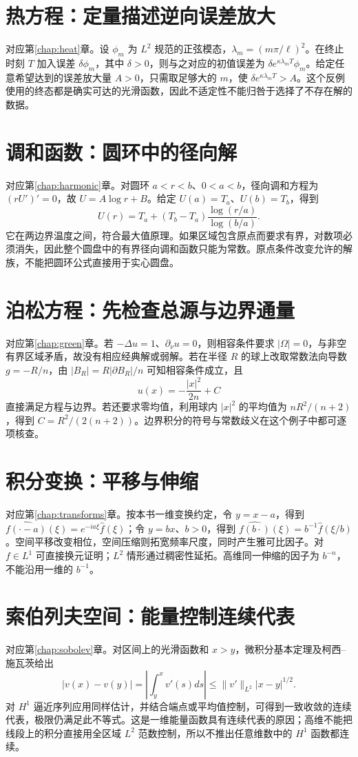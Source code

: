 \section{热方程：定量描述逆向误差放大}
对应第\ref{chap:heat}章。设 $\phi_m$ 为 $L^2$ 规范的正弦模态，$\lambda_m=(m\pi/\ell)^2$。在终止时刻 $T$ 加入误差 $\delta\phi_m$，其中 $\delta>0$，则与之对应的初值误差为 $\delta e^{\kappa\lambda_mT}\phi_m$。给定任意希望达到的误差放大量 $A>0$，只需取足够大的 $m$，使 $\delta e^{\kappa\lambda_mT}>A$。这个反例使用的终态都是确实可达的光滑函数，因此不适定性不能归咎于选择了不存在解的数据。

\section{调和函数：圆环中的径向解}
对应第\ref{chap:harmonic}章。对圆环 $a<r<b$、$0<a<b$，径向调和方程为 $(rU')'=0$，故 $U=A\log r+B$。给定 $U(a)=T_a$、$U(b)=T_b$，得到
\[
 U(r)=T_a+(T_b-T_a)\frac{\log(r/a)}{\log(b/a)}.
\]
它在两边界温度之间，符合最大值原理。如果区域包含原点而要求有界，对数项必须消失，因此整个圆盘中的有界径向调和函数只能为常数。原点条件改变允许的解族，不能把圆环公式直接用于实心圆盘。

\section{泊松方程：先检查总源与边界通量}
对应第\ref{chap:green}章。若 $-\Delta u=1$、$\partial_\nu u=0$，则相容条件要求 $|\Omega|=0$，与非空有界区域矛盾，故没有相应经典解或弱解。若在半径 $R$ 的球上改取常数法向导数 $g=-R/n$，由 $|B_R|=R|\partial B_R|/n$ 可知相容条件成立，且
\[
 u(x)=-\frac{|x|^2}{2n}+C
\]
直接满足方程与边界。若还要求零均值，利用球内 $|x|^2$ 的平均值为 $nR^2/(n+2)$，得到 $C=R^2/(2(n+2))$。边界积分的符号与常数歧义在这个例子中都可逐项核查。

\section{积分变换：平移与伸缩}
对应第\ref{chap:transforms}章。按本书一维变换约定，令 $y=x-a$，得到 $\widehat{f(\cdot-a)}(\xi)=e^{-ia\xi}\widehat f(\xi)$；令 $y=bx$、$b>0$，得到 $\widehat{f(b\cdot)}(\xi)=b^{-1}\widehat f(\xi/b)$。空间平移改变相位，空间压缩则拓宽频率尺度，同时产生雅可比因子。对 $f\in L^1$ 可直接换元证明；$L^2$ 情形通过稠密性延拓。高维同一伸缩的因子为 $b^{-n}$，不能沿用一维的 $b^{-1}$。

\section{索伯列夫空间：能量控制连续代表}
对应第\ref{chap:sobolev}章。对区间上的光滑函数和 $x>y$，微积分基本定理及柯西--施瓦茨给出
\[
 |v(x)-v(y)|=\left|\int_y^xv'(s)ds\right|
 \le\|v'\|_{L^2}|x-y|^{1/2}.
\]
对 $H^1$ 逼近序列应用同样估计，并结合端点或平均值控制，可得到一致收敛的连续代表，极限仍满足此不等式。这是一维能量函数具有连续代表的原因；高维不能把线段上的积分直接用全区域 $L^2$ 范数控制，所以不推出任意维数中的 $H^1$ 函数都连续。

